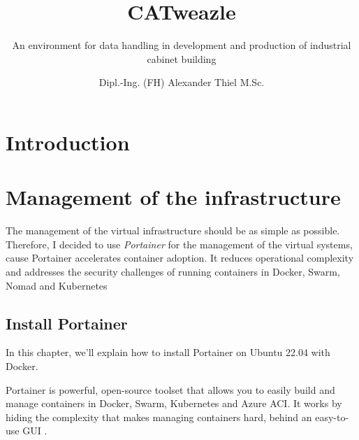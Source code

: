 \documentclass[%
	a4paper,
	oneside,
	listof=numbered,
	parskip=half,
	headsepline=true,
	footsepline=false,
	0.7headlines,
	]{scrbook}
\begin{document}
\title{CATweazle}
\subtitle{An environment for data handling in development and production of industrial cabinet building}
\subject{Industrial cabinet building}
\author{Dipl.-Ing. (FH) Alexander Thiel M.Sc.}


\maketitle
\tableofcontents

\chapter{Introduction}\label{ch:introduction}


\chapter{Management of the infrastructure}\label{ch:portainer}

The management of the virtual infrastructure should be as simple as possible.
Therefore, I decided to use \emph{Portainer} for the management of the virtual systems, cause Portainer accelerates container adoption.
It reduces operational complexity and addresses the security challenges of running containers in Docker, Swarm, Nomad and Kubernetes

\section{Install Portainer}\label{sec:install-portainer}

In this chapter, we’ll explain how to install Portainer on Ubuntu 22.04 with Docker.

Portainer is powerful, open-source toolset that allows you to easily build and manage
containers in Docker, Swarm, Kubernetes and Azure ACI. It works by hiding the complexity
that makes managing containers hard, behind an easy-to-use GUI .
\end{document}
